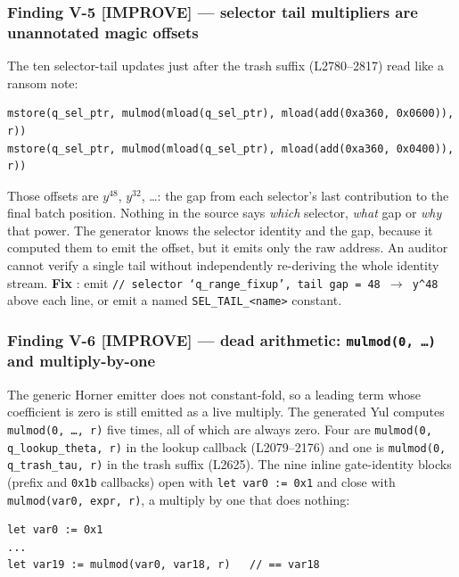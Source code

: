 \subsubsection*{Finding V-5 \textcolor{codegenblue}{[IMPROVE]} --- selector tail multipliers are unannotated magic offsets}

The ten selector-tail updates just after the trash suffix
(L2780--2817) read like a ransom note:

\begin{lstlisting}[style=yul]
mstore(q_sel_ptr, mulmod(mload(q_sel_ptr), mload(add(0xa360, 0x0600)), r))
mstore(q_sel_ptr, mulmod(mload(q_sel_ptr), mload(add(0xa360, 0x0400)), r))
\end{lstlisting}

Those offsets are $y^{48}$, $y^{32}$, \dots: the gap from each
selector's last contribution to the final batch position. Nothing
in the source says \emph{which} selector, \emph{what} gap or
\emph{why} that power. The generator knows the selector identity and
the gap, because it computed them to emit the offset, but it emits
only the raw address. An auditor cannot verify a single tail without
independently re-deriving the whole identity stream. \textbf{Fix}
: emit
\texttt{/\allowbreak{}/\allowbreak{} selector `q\_\allowbreak{}range\_\allowbreak{}fixup', tail gap = 48 $\to$ y\textasciicircum48}
above each line, or emit a named \texttt{SEL\_TAIL\_<name>} constant.

\subsubsection*{Finding V-6 \textcolor{codegenblue}{[IMPROVE]} --- dead arithmetic: \texttt{mulmod(0, \ldots)} and multiply-by-one}

The generic Horner emitter does not constant-fold, so a leading term
whose coefficient is zero is still emitted as a live multiply. The
generated Yul computes \texttt{mulmod(0, \ldots, r)} five times,
all of which are always zero. Four are
\texttt{mulmod(0, q\_\allowbreak{}lookup\_\allowbreak{}theta, r)} in the lookup callback
(L2079--2176) and one is \texttt{mulmod(0, q\_\allowbreak{}trash\_\allowbreak{}tau, r)} in the
trash suffix (L2625). The nine inline gate-identity blocks (prefix
and \texttt{0x1b} callbacks) open with \texttt{let var0 := 0x1} and
close with \texttt{mulmod(var0, expr, r)}, a multiply by one that
does nothing:

\begin{lstlisting}[style=yul]
let var0 := 0x1
...
let var19 := mulmod(var0, var18, r)   // == var18
\end{lstlisting}

